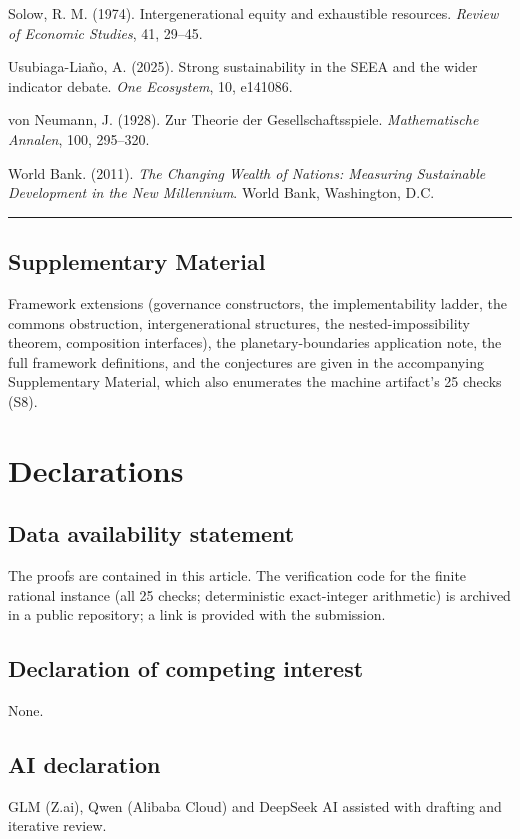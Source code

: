 \documentclass[11pt]{article}
\begin{document}
Solow, R. M. (1974). Intergenerational equity and exhaustible resources.
\emph{Review of Economic Studies}, 41, 29--45.

Usubiaga-Lia\~no, A. (2025). Strong sustainability in the SEEA and the
wider indicator debate. \emph{One Ecosystem}, 10, e141086.

von Neumann, J. (1928). Zur Theorie der Gesellschaftsspiele.
\emph{Mathematische Annalen}, 100, 295--320.

World Bank. (2011). \emph{The Changing Wealth of Nations: Measuring
Sustainable Development in the New Millennium}. World Bank, Washington,
D.C.

\begin{center}\rule{0.5\linewidth}{0.5pt}\end{center}

\subsection{Supplementary Material}\label{supplementary-material}

Framework extensions (governance constructors, the implementability ladder, the commons obstruction, intergenerational structures, the nested-impossibility theorem, composition interfaces), the planetary-boundaries application note, the full framework definitions, and the conjectures are given in the accompanying Supplementary Material, which also enumerates the machine artifact's 25 checks (S8).

\section*{Declarations}

\subsection*{Data availability statement}

The proofs are contained in this article. The verification code for the finite rational instance (all 25 checks; deterministic exact-integer arithmetic) is archived in a public repository; a link is provided with the submission.

\subsection*{Declaration of competing interest}

None.

\subsection*{AI declaration}
GLM (Z.ai), Qwen (Alibaba Cloud) and DeepSeek AI assisted with drafting and iterative review.
\end{document}

